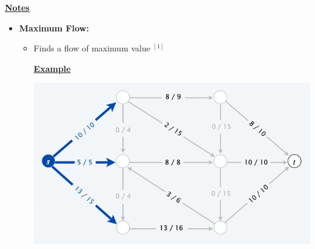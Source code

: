 \documentclass[12pt]{article}
\begin{document}
\begin{enumerate}[1.]











    \bigskip

    \underline{\textbf{Notes}}

    \begin{itemize}
        \item \textbf{Maximum Flow:}

        \begin{itemize}
            \item Finds a flow of maximum value $^{[1]}$

            \bigskip

            \underline{\textbf{Example}}

            \bigskip

            \begin{center}
            \includegraphics[width=0.7\linewidth]{images/worksheet_5_solution_3.png}
            \end{center}


\end{itemize}
\end{itemize}
\end{enumerate}
\end{document}
